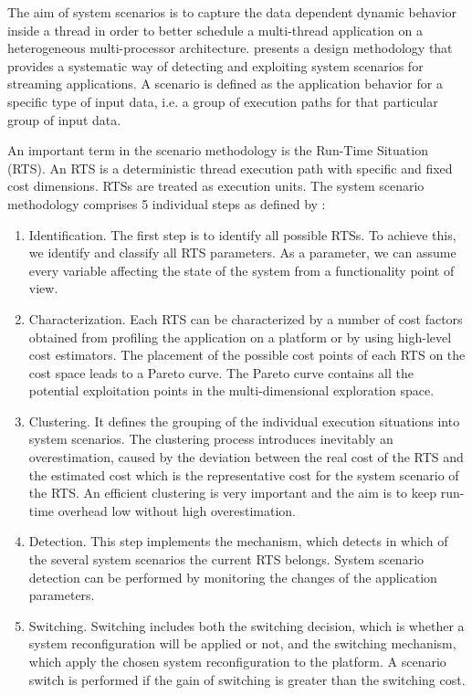 	The aim of system scenarios is to capture the data dependent dynamic behavior inside a thread in order to better schedule a multi-thread application on a heterogeneous multi-processor architecture. \cite{14} presents a design methodology that provides a systematic way of detecting and exploiting system scenarios for streaming applications. A scenario is defined as the application behavior for a specific type of input data, i.e. a group of execution paths for that particular group of input data.

An important term in the scenario methodology is the Run-Time Situation (RTS). An RTS is a deterministic thread execution path with specific and fixed cost dimensions. RTSs are treated as execution units. The system scenario methodology comprises 5 individual steps as defined by \cite{17}:
\begin{enumerate}
\item 	Identification. The first step is to identify all possible RTSs. To achieve this, we identify and classify all RTS parameters. As a parameter, we can assume every variable affecting the state of the system from a functionality point of view.
\item Characterization. Each RTS can be characterized by a number of cost factors obtained from profiling the application on a platform or by using high-level cost estimators. The placement of the possible cost points of each RTS on the cost space leads to a Pareto curve. The Pareto curve contains all the potential exploitation points in the multi-dimensional exploration space.
\item Clustering. It defines the grouping of the individual execution situations into system scenarios. The clustering process introduces inevitably an overestimation, caused by the deviation between the real cost of the RTS and the estimated cost which is the representative cost for the system scenario of the RTS. An efficient clustering is very important and the aim is to keep run-time overhead low without high overestimation. 
\item Detection. This step implements the mechanism, which detects in which of the several system scenarios the current RTS belongs. System scenario detection can be performed by monitoring the changes of the application parameters.
\item Switching. Switching includes both the switching decision, which is whether a system reconfiguration will be applied or not, and the switching mechanism, which apply the chosen system reconfiguration to the platform. A scenario switch is performed if the gain of switching is greater than the switching cost. 
\end{enumerate}

